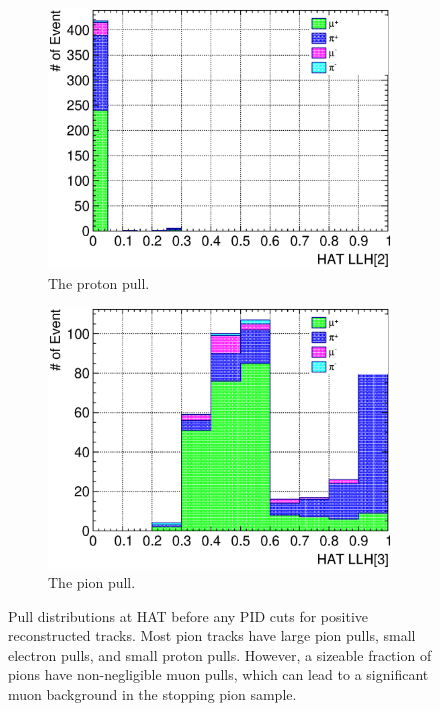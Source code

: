 \begin{figure}
\begin{subfigure}{\dbfigwid\textwidth}
               \end{subfigure}
               \\
               \begin{subfigure}{\dbfigwid\textwidth}
                    \includegraphics[width=\textwidth]{figures/sel/sspi_TOP_hat_pid2_stack_al5.eps}
                    \caption{The proton pull.}
                    \label{subfig:sppi-pulls-3}
               \end{subfigure}
               \begin{subfigure}{\dbfigwid\textwidth}
                    \includegraphics[width=\textwidth]{figures/sel/sspi_TOP_hat_pid3_stack_al5.eps}
                    \caption{The pion pull.}
                    \label{subfig:sppi-pulls-4}
               \end{subfigure}
               \caption{Pull distributions at HAT before any PID cuts for positive reconstructed tracks. Most pion tracks have large pion pulls, small electron pulls, and small proton pulls. However, a sizeable fraction of pions have non-negligible muon pulls, which can lead to a significant muon background in the stopping pion sample.}
               \label{fig:pulls}
          \end{figure}

